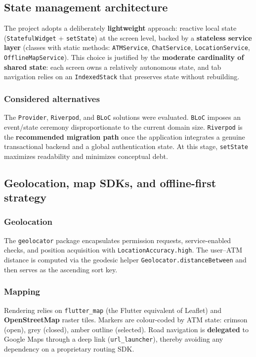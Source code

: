 \documentclass[11pt,a4paper]{article}
\newcommand{\code}[1]{\texttt{#1}}
\begin{document}
\subsection{State management architecture}
The project adopts a deliberately \textbf{lightweight} approach: reactive local
state (\code{StatefulWidget} + \code{setState}) at the screen level, backed by a
\textbf{stateless service layer} (classes with static methods:
\code{ATMService}, \code{ChatService}, \code{LocationService},
\code{OfflineMapService}). This choice is justified by the \textbf{moderate
cardinality of shared state}: each screen owns a relatively autonomous state, and
tab navigation relies on an \code{IndexedStack} that preserves state without
rebuilding.

\subsubsection{Considered alternatives}
The \code{Provider}, \code{Riverpod}, and \code{BLoC} solutions were evaluated.
\code{BLoC} imposes an event/state ceremony disproportionate to the current
domain size. \code{Riverpod} is the \textbf{recommended migration path} once the
application integrates a genuine transactional backend and a global
authentication state. At this stage, \code{setState} maximizes readability and
minimizes conceptual debt.

\subsection{Geolocation, map SDKs, and offline-first strategy}
\subsubsection{Geolocation}
The \code{geolocator} package encapsulates permission requests, service-enabled
checks, and position acquisition with \code{LocationAccuracy.high}. The
user--ATM distance is computed via the geodesic helper
\code{Geolocator.distanceBetween} and then serves as the ascending sort key.

\subsubsection{Mapping}
Rendering relies on \code{flutter\_map} (the Flutter equivalent of Leaflet) and
\textbf{OpenStreetMap} raster tiles. Markers are colour-coded by ATM state:
crimson (open), grey (closed), amber outline (selected). Road navigation is
\textbf{delegated} to Google Maps through a deep link (\code{url\_launcher}),
thereby avoiding any dependency on a proprietary routing SDK.
\end{document}
